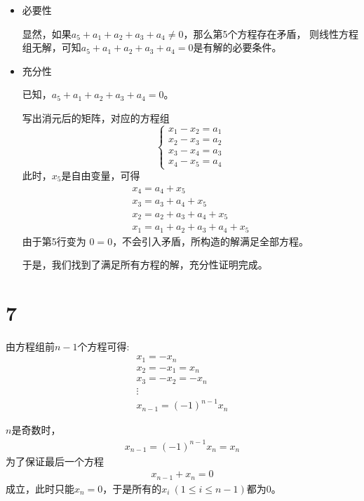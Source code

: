 \documentclass{article}
\begin{document}
\begin{itemize}
  \item 必要性

        显然，如果$a_5 + a_1 + a_2 + a_3 + a_4 \neq 0$，那么第5个方程存在矛盾，
        则线性方程组无解，可知$a_5 + a_1 + a_2 + a_3 + a_4 = 0$是有解的必要条件。

  \item 充分性

        已知，$a_5 + a_1 + a_2 + a_3 + a_4 = 0$。

        写出消元后的矩阵，对应的方程组
        \begin{equation*}
          \begin{cases*}
            x_1 - x_2 = a_1 \\
            x_2 - x_3 = a_2 \\
            x_3 - x_4 = a_3 \\
            x_4 - x_5 = a_4
          \end{cases*}
        \end{equation*}
        此时，$x_5$是自由变量，可得
        \begin{align*}
          x_4 = a_4 + x_5             \\
          x_3 = a_3 + a_4 + x_5       \\
          x_2 = a_2 + a_3 + a_4 + x_5 \\
          x_1 = a_1 + a_2 + a_3 + a_4 + x_5
        \end{align*}
        由于第5行变为 $0 = 0$，不会引入矛盾，所构造的解满足全部方程。

        于是，我们找到了满足所有方程的解，充分性证明完成。
\end{itemize}

\section*{7}

由方程组前$n - 1$个方程可得:
\begin{align*}
  x_1 = - x_n       \\
  x_2 = -x_1 = x_n  \\
  x_3 = -x_2 = -x_n \\
  \vdots            \\
  x_{n - 1} = (-1)^{n - 1} x_n
\end{align*}

$n$是奇数时，
\begin{align*}
  x_{n - 1} = (-1)^{n - 1} x_n = x_n
\end{align*}
为了保证最后一个方程
\begin{align*}
  x_{n - 1} + x_n = 0
\end{align*}
成立，此时只能$x_n = 0$，于是所有的$x_i \ (1 \leq i \leq n - 1)$都为0。
\end{document}
